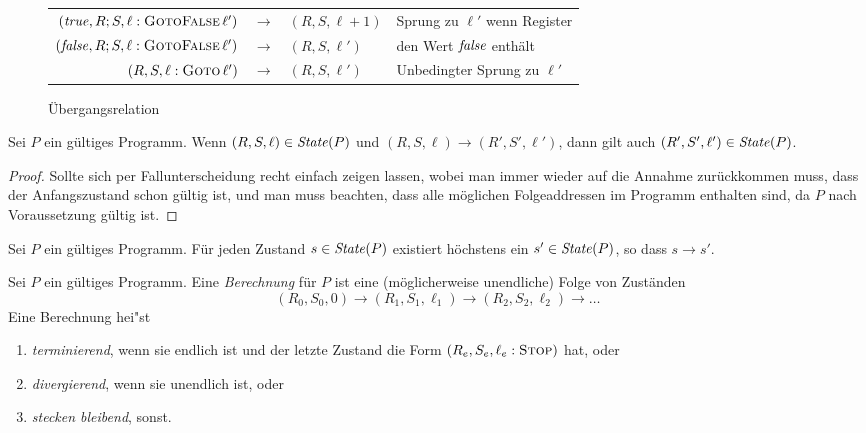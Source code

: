 \documentclass[12pt,fleqn]{article}
\begin{document}
\begin{figure}
{\begin{center}
\begin{tabular}{|rcl|l|}
      $({\text{\it true\/}},R;S,\ell:\textsc{GotoFalse}\,\ell')$ & $\to$ & $(R,S,\ell+1)$ & Sprung zu $\ell'$ wenn Register \\
      $({\text{\it false\/}},R;S,\ell:\textsc{GotoFalse}\,\ell')$ & $\to$ & $(R,S,\ell')$ & den Wert ${\text{\it false\/}}$ enth\"alt \\
      $(R,S,\ell:\textsc{Goto}\,\ell')$ & $\to$ & $(R,S,\ell')$ & Unbedingter Sprung zu $\ell'$ \\
      \hline
    \end{tabular}
  \end{center}}
  \caption{\"Ubergangsrelation}
  \label{table:CAM_Reductions}
\end{figure}

\begin{lemma}
  Sei $P$ ein g\"ultiges Programm. Wenn $(R,S,\ell)\in{\text{\it State\/}}(P)$ und $(R,S,\ell) \to (R',S',\ell')$, dann
  gilt auch $(R',S',\ell')\in{\text{\it State\/}}(P)$.
\end{lemma}

\begin{proof}
  Sollte sich per Fallunterscheidung recht einfach zeigen lassen, wobei man immer wieder auf die Annahme zur\"uckkommen
  muss, dass der Anfangszustand schon g\"ultig ist, und man muss beachten, dass alle m\"oglichen Folgeaddressen
  im Programm enthalten sind, da $P$ nach Voraussetzung g\"ultig ist.
\end{proof}

\begin{lemma}
  Sei $P$ ein g\"ultiges Programm. F\"ur jeden Zustand $s\in{\text{\it State\/}}(P)$ existiert h\"ochstens ein $s'\in{\text{\it State\/}}(P)$, so
  dass $s \to s'$.
\end{lemma}

\begin{definition}[Berechnung]
  Sei $P$ ein g\"ultiges Programm. Eine {\em Berechnung} f\"ur $P$ ist eine (m\"oglicherweise unendliche) Folge von
  Zust\"anden
  \[
  (R_0,S_0,0) \to (R_1,S_1,\ell_1) \to (R_2,S_2,\ell_2) \to \ldots
  \]
  Eine Berechnung hei"st
  \begin{enumerate}
    \item {\em terminierend}, wenn sie endlich ist und der letzte Zustand die Form
      $(R_e,S_e,\ell_e:\textsc{Stop})$ hat, oder
    \item {\em divergierend}, wenn sie unendlich ist, oder
    \item {\em stecken bleibend}, sonst.
  \end{enumerate}
\end{definition}
\end{document}
